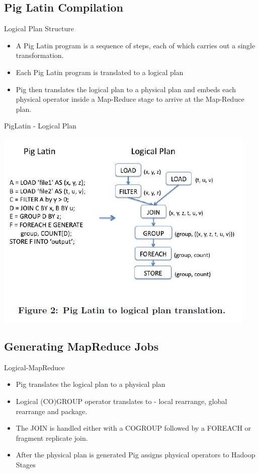 \subsection{Pig Latin Compilation}
\begin{frame}{Logical Plan Structure}
\begin{itemize}
	\item A Pig Latin program is a sequence of steps, each of which carries out a single transformation.
	\item Each Pig Latin program is translated to a logical plan
	\item Pig then translates the logical plan to a physical plan and embeds each physical operator inside a Map-Reduce stage to arrive at the Map-Reduce plan.
\end{itemize}
\end{frame}

\begin{frame}{PigLatin - Logical Plan}
\centerline{\includegraphics[scale=0.55]{Images/PigLatin.JPG}}
\let\thefootnote\relax{}
\end{frame}

\subsection{Generating MapReduce Jobs}
\begin{frame}{Logical-MapReduce}
\begin{itemize}
	\item Pig translates the logical plan to a physical plan
	\item Logical (CO)GROUP operator translates to - local rearrange, global rearrange and package.
	\item The JOIN is handled either with a COGROUP followed by a FOREACH or fragment replicate join.
	\item After the physical plan is generated Pig assigns physical operators to Hadoop Stages
\end{itemize}
\end{frame}

